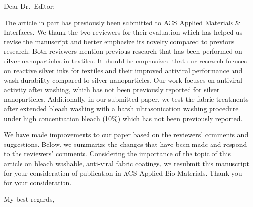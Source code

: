 \documentclass[12pt]{letter}
\date{\today}
\begin{document}
\begin{letter}{}

\opening{Dear Dr.~Editor:}


The article in part has previously been submitted to ACS Applied Materials \& Interfaces. We thank the two reviewers for their evaluation which has helped us revise the manuscript and better emphasize its novelty compared to previous research.  Both reviewers mention previous research that has been performed on  silver nanoparticles in textiles.  It should be emphasized that our research focuses on reactive silver inks for textiles and their improved antiviral performance and wash durability compared to silver nanoparticles.
Our work focuses on antiviral activity after washing, which has not been previously reported for silver nanoparticles.  
Additionally, in our submitted paper, we test the fabric treatments after extended bleach washing with a harsh ultrasonication washing procedure under high concentration bleach (10\%) which has not been previously reported. 



We have made improvements to our paper based on the reviewers' comments and suggestions.
Below, we summarize the changes that have been made and respond to the reviewers' comments.
Considering the importance of the topic of this
article on 
bleach washable, anti-viral fabric coatings,
we resubmit this manuscript for your consideration of publication in ACS Applied Bio Materials.
Thank you for your consideration.

\closing{My best regards,}




\end{letter}




\end{document}
